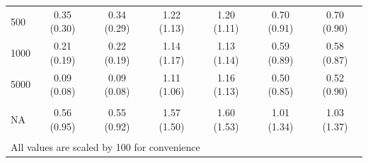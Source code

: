 \documentclass[AMA,STIX1COL,doublespace]{WileyNJD-v2}
\begin{document}
\begin{table}
\begin{tabular}[t]{lcccccc}
\hspace{1em}500 & 0.35 (0.30) & 0.34 (0.29) & 1.22 (1.13) & 1.20 (1.11) & 0.70 (0.91) & 0.70 (0.90)\\
\hspace{1em}1000 & 0.21 (0.19) & 0.22 (0.19) & 1.14 (1.17) & 1.13 (1.14) & 0.59 (0.89) & 0.58 (0.87)\\
\hspace{1em}5000 & 0.09 (0.08) & 0.09 (0.08) & 1.11 (1.06) & 1.16 (1.13) & 0.50 (0.85) & 0.52 (0.90)\\
\addlinespace[0.75em]
\multicolumn{7}{l}{\textbf{Overall}}\\
\hline
\hspace{1em}NA & 0.56 (0.95) & 0.55 (0.92) & 1.57 (1.50) & 1.60 (1.53) & 1.01 (1.34) & 1.03 (1.37)\\
\bottomrule
\multicolumn{7}{l}{\textsuperscript{} All values are scaled by 100 for convenience}\\
\end{tabular}
\end{table}
\end{document}
